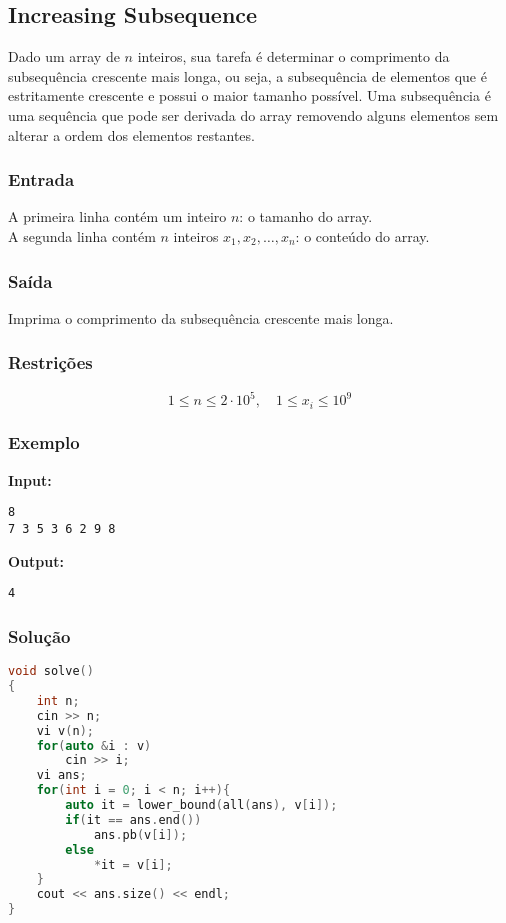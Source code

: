 \subsection{Increasing Subsequence}
Dado um array de \( n \) inteiros, sua tarefa é determinar o comprimento da subsequência crescente mais longa, ou seja, a subsequência de elementos que é estritamente crescente e possui o maior tamanho possível. Uma subsequência é uma sequência que pode ser derivada do array removendo alguns elementos sem alterar a ordem dos elementos restantes.

\subsubsection*{Entrada}
A primeira linha contém um inteiro \( n \): o tamanho do array.\\
A segunda linha contém \( n \) inteiros \( x_1, x_2, \dots, x_n \): o conteúdo do array.

\subsubsection*{Saída}
Imprima o comprimento da subsequência crescente mais longa.

\subsubsection*{Restrições}
\[
1 \le n \le 2\cdot 10^5,\quad 1 \le x_i \le 10^9
\]

\subsubsection*{Exemplo}

\textbf{Input:}
\begin{verbatim}
8
7 3 5 3 6 2 9 8
\end{verbatim}

\textbf{Output:}
\begin{verbatim}
4
\end{verbatim}

\subsubsection*{Solução}
\begin{lstlisting}[language=C++]
void solve()
{
    int n; 
    cin >> n;
    vi v(n);
    for(auto &i : v) 
        cin >> i;
    vi ans;
    for(int i = 0; i < n; i++){
        auto it = lower_bound(all(ans), v[i]);
        if(it == ans.end()) 
            ans.pb(v[i]);
        else 
            *it = v[i];
    }
    cout << ans.size() << endl;
}
\end{lstlisting}

